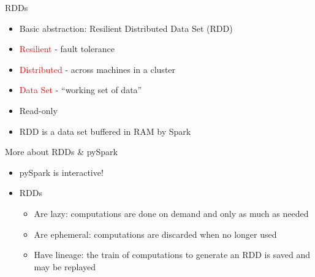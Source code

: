\documentclass[aspectratio=169]{beamer}
\begin{document}


\begin{frame}{RDDs}

\begin{itemize}
\item Basic abstraction: Resilient Distributed Data Set (RDD)
\item {\textcolor{red}{Resilient}} - fault tolerance
\item {\textcolor{red}{Distributed}} - across machines in a cluster
\item {\textcolor{red}{Data Set}} - ``working set of data''
\item Read-only
\item RDD is a data set buffered in RAM by Spark
\end{itemize}

\end{frame}



\begin{frame}{More about RDDs \& pySpark}

\begin{itemize}
\item pySpark is interactive!
\item RDDs
\begin{itemize}
\item Are lazy: computations are done on demand and only as much as needed
\item Are ephemeral: computations are discarded when no longer used
\item Have lineage: the train of computations to generate an RDD is saved and may be replayed
\end{itemize}
\end{itemize}

\end{frame}
\end{document}
